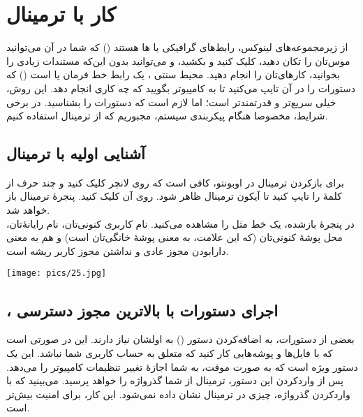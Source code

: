\chapter{کار با ترمینال}
از زیرمجموعه‌های لینوکس، رابط‌های گرافیکی یا ها هستند () که شما در آن می‌توانید موس‌تان را تکان دهید، کلیک کنید و بکشید، و می‌توانید بدون این‌که مستندات زیادی را بخوانید، کارهای‌تان را انجام دهید. محیط سنتی ، یک رابط خط فرمان یا  است () که دستورات را در آن تایپ می‌کنید تا به کامپیوتر بگویید که چه کاری انجام دهد. این روش، خیلی سریع‌تر و قدرتمندتر است؛ اما لازم است که دستورات را بشناسید. در برخی شرایط، مخصوصا هنگام پیکربندی سیستم، مجبوریم که از ترمینال استفاده کنیم.

\section{آشنایی اولیه با ترمینال}
برای بازکردن ترمینال در اوبونتو، کافی است که روی لانچر کلیک کنید و چند حرف از کلمهٔ  را تایپ کنید تا آیکون ترمینال ظاهر شود. روی آن کلیک کنید. پنجرهٔ ترمینال باز خواهد شد.\\
در پنجرهٔ بازشده، یک خط مثل  را مشاهده می‌کنید.  نام کاربری کنونی‌تان،  نام رایانهٔ‌تان، \lr{\texttt{$\sim$}} محل پوشهٔ کنونی‌تان (که این علامت، به معنی پوشهٔ خانگی‌تان است) و \lr{\texttt{\$}} هم به معنی دارابودن مجوز عادی و نداشتن مجوز کاربر ریشه است.
\begin{center}
\texttt{[image: pics/25.jpg]}
\end{center}

\section[،sudo اجرای دستورات با بالاترین مجوز دسترسی]{، اجرای دستورات با بالاترین مجوز دسترسی}
بعضی از دستورات، به اضافه‌کردن دستور  () به اولشان نیاز دارند. این در صورتی است که با فایل‌ها و پوشه‌هایی کار کنید که متعلق به حساب کاربری شما نباشد. این یک دستور ویژه است که به صورت موقت، به شما اجازهٔ تغییر تنظیمات کامپیوتر را می‌دهد. پس از واردکردن این دستور، ترمینال از شما گذرواژه را خواهد پرسید. می‌بینید که با واردکردن گذرواژه، چیزی در ترمینال نشان داده نمی‌شود. این کار، برای امنیت بیش‌تر است.

